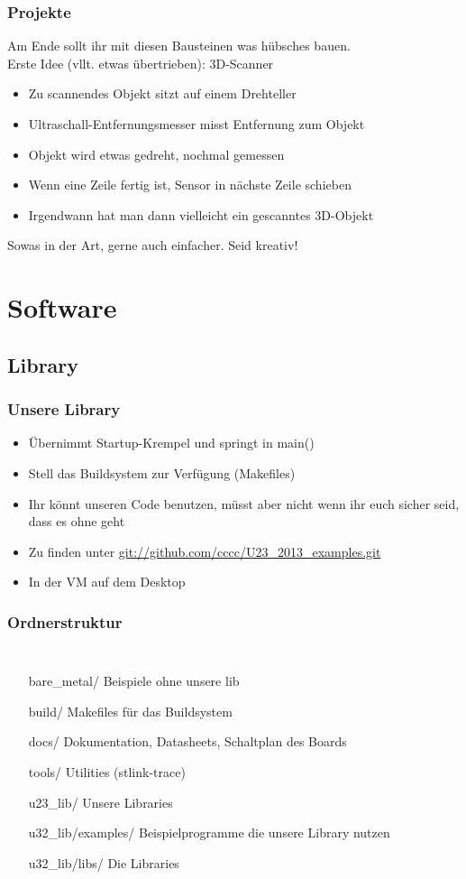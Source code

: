 \documentclass[ngerman,compress]{beamer}
\begin{document}
\begin{frame}
	\frametitle{Projekte}
	Am Ende sollt ihr mit diesen Bausteinen was hübsches bauen. \\
	Erste Idee (vllt. etwas übertrieben): 3D-Scanner
	\begin{itemize}
		\item Zu scannendes Objekt sitzt auf einem Drehteller
		\item Ultraschall-Entfernungsmesser misst Entfernung zum Objekt
		\item Objekt wird etwas gedreht, nochmal gemessen
		\item Wenn eine Zeile fertig ist, Sensor in nächste Zeile schieben
		\item Irgendwann hat man dann vielleicht ein gescanntes 3D-Objekt
	\end{itemize}
	Sowas in der Art, gerne auch einfacher. Seid kreativ!
\end{frame}

\section{Software}

\subsection{Library}

\begin{frame}
	\frametitle{Unsere Library}
	\begin{itemize}
		\item Übernimmt Startup-Krempel und springt in main()
		\item Stell das Buildsystem zur Verfügung (Makefiles)
		\item Ihr könnt unseren Code benutzen, müsst aber nicht wenn ihr euch sicher seid, dass es ohne geht
		\item Zu finden unter \url{git://github.com/cccc/U23_2013_examples.git}
		\item In der VM auf dem Desktop
	\end{itemize}
\end{frame}

\begin{frame}
	\frametitle{Ordnerstruktur}
	\begin{columns}
			\column{3in}
	\begin{itemize}
		\item[bare\_metal/] Beispiele ohne unsere lib
		\item[build/] Makefiles für das Buildsystem
		\item[docs/] Dokumentation, Datasheets, Schaltplan des Boards
		\item[tools/] Utilities (stlink-trace)
		\item[u23\_lib/] Unsere Libraries
		\item[u32\_lib/examples/] Beispielprogramme die unsere Library nutzen
		\item[u32\_lib/libs/] Die Libraries
	\end{itemize}
	\end{columns}
\end{frame}
\end{document}
